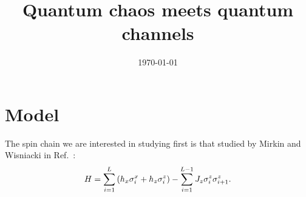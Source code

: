 \documentclass[10pt,letterpaper]{article}
\title{Quantum chaos meets quantum channels}
\author{}
\date{\today}
\newcommand{\mcE}{\mathcal E}
\newcommand{\mcP}{\mathcal P}
\begin{document}
\maketitle

%
%
%
%

\section{Model}
The spin chain we are interested in studying first is that studied by 
Mirkin and Wisniacki in Ref.~\cite{mirkin2021quantum}:
\begin{equation}\label{eq:H:wisniacki:ising:chain}
H = 
\sum_{i=1}^{L}
\qty(
h_x \sigma_i^x +
h_z \sigma_i^z
) -
\sum_{i=1}^{L-1}
J_z \sigma_{i}^z \sigma_{i+1}^z.
\end{equation}
\end{document}
